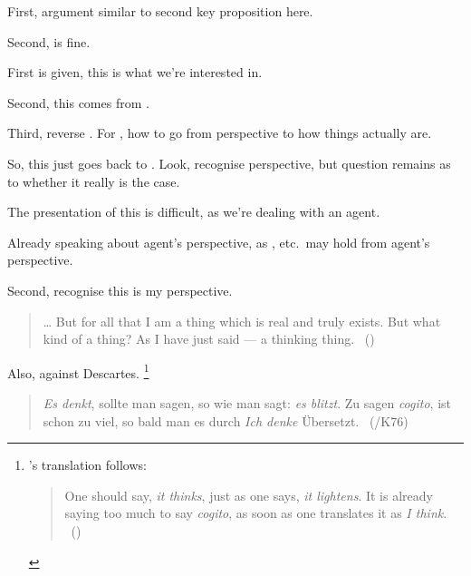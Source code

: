 \begin{note}
  First, argument similar to second key proposition here.
\end{note}

\begin{note}
  Second, \qzS{} is fine.
\end{note}

\newpage

\begin{note}
  First is given, this is what we're interested in.

  Second, this comes from \citeauthor{Descartes:1996vp}.

  Third, reverse \citeauthor{Descartes:1996vp}.
  For \citeauthor{Descartes:1996vp}, how to go from perspective to how things actually are.
\end{note}

\begin{note}
  So, this just goes back to \citeauthor{Descartes:1996vp}.
  Look, recognise perspective, but question remains as to whether it really is the case.

  The presentation of this is difficult, as we're dealing with an agent.

  Already speaking about agent's perspective, as , etc.\ may hold from agent's perspective.
\end{note}

\begin{note}
  Second, recognise this is my perspective.

  \cite{Descartes:1996vp}

  \begin{quote}
    \dots
    But for all that I am a thing which is real and truly exists.
    But what kind of a thing?
    As I have just said --- a thinking thing.%
    \mbox{ }\hfill\mbox{(\citeyear[18]{Descartes:1996vp})}
  \end{quote}

  Also, \citeauthor{Lichtenberg:1991tf} against Descartes.%
  \footnote{
    \citeauthor{Zoller:1992ud}'s translation follows:
    \begin{quote}
      One should say, \emph{it thinks}, just as one says, \emph{it lightens}.
      It is already saying too much to say \emph{cogito}, as soon as one translates it as \emph{I think}.
      \mbox{ }\hfill\mbox{(\citeyear[418]{Zoller:1992ud})}
    \end{quote}
  }
  \begin{quote}
    \emph{Es denkt}, sollte man sagen, so wie man sagt: \emph{es blitzt}.
    Zu sagen \emph{cogito}, ist schon zu viel, so bald man es durch \emph{Ich denke} \"{U}bersetzt.
    \mbox{ }\hfill\mbox{(\citeyear[412]{Lichtenberg:1991tf}/K76)}
  \end{quote}
\end{note}

